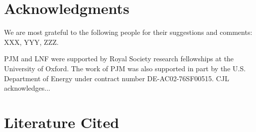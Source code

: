 \documentclass{ar2e}
\begin{document}

\section*{Acknowledgments}

We are most grateful to the following people for their suggestions and comments:
XXX, YYY, ZZZ. 

PJM and LNF were supported by Royal Society research fellowships at the
University of Oxford. The work of PJM was also supported in part  by the U.S.
Department of Energy under contract number DE-AC02-76SF00515.
%
CJL acknowledges...



\section{Literature Cited}





\end{document}
